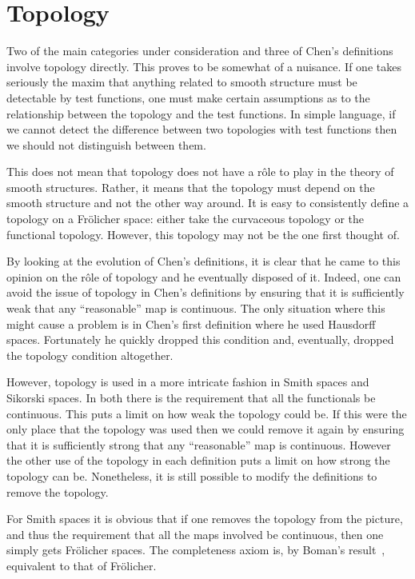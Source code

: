 \documentclass[%
12pt,%
arxiv,%
defaults
]{myclass}
\begin{document}
\section{Topology}
\label{sec:topology}

Two of the main categories under consideration and three of Chen's definitions involve topology directly.
This proves to be somewhat of a nuisance.
If one takes seriously the maxim that anything related to smooth structure must be detectable by test functions, one must make certain assumptions as to the relationship between the topology and the test functions.
In simple language, if we cannot detect the difference between two topologies with test functions then we should not distinguish between them.

This does not mean that topology does not have a r\^ole to play in the theory of smooth structures.
Rather, it means that the topology must depend on the smooth structure and not the other way around.
It is easy to consistently define a topology on a Fr\"olicher space: either take the curvaceous topology or the functional topology.
However, this topology may not be the one first thought of.

By looking at the evolution of Chen's definitions, it is clear that he came to this opinion on the r\^ole of topology and he eventually disposed of it.
Indeed, one can avoid the issue of topology in Chen's definitions by ensuring that it is sufficiently weak that any ``reasonable'' map is continuous.
The only situation where this might cause a problem is in Chen's first definition where he used Hausdorff spaces.
Fortunately he quickly dropped this condition and, eventually, dropped the topology condition altogether.

However, topology is used in a more intricate fashion in Smith spaces and Sikorski spaces.
In both there is the requirement that all the functionals be continuous.
This puts a limit on how weak the topology could be.
If this were the only place that the topology was used then we could remove it again by ensuring that it is sufficiently strong that any ``reasonable'' map is continuous.
However the other use of the topology in each definition puts a limit on how strong the topology can be.
Nonetheless, it is still possible to modify the definitions to remove the topology.

For Smith spaces it is obvious that if one removes the topology from the picture, and thus the requirement that all the maps involved be continuous, then one simply gets Fr\"olicher spaces.
The completeness axiom is, by Boman's result~\cite{jb3}, equivalent to that of Fr\"olicher.
\end{document}
